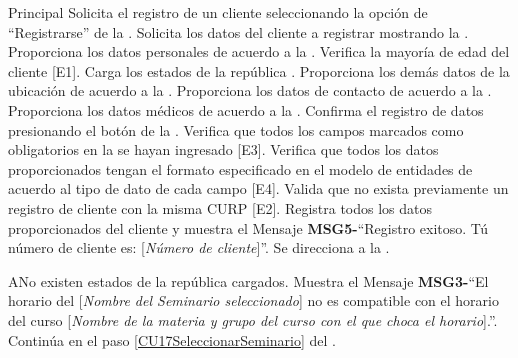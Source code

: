 	\begin{UCtrayectoria}{Principal}
		\UCpaso[\UCactor] Solicita el registro de un cliente seleccionando la opción de ``Registrarse'' de la .
		\UCpaso Solicita los datos del cliente a registrar mostrando la .
		\UCpaso[\UCactor] Proporciona los datos personales de acuerdo a la .
		\UCpaso Verifica la mayoría de edad del cliente [E1].
		\UCpaso Carga los estados de la república .
		\UCpaso[\UCactor] Proporciona los demás datos de la ubicación de acuerdo a la .
		\UCpaso[\UCactor] Proporciona los datos de contacto de acuerdo a la .
		\UCpaso[\UCactor] Proporciona los datos médicos de acuerdo a la .
		\UCpaso[\UCactor] Confirma el registro de datos presionando el botón  de la .
		\UCpaso Verifica que todos los campos marcados como obligatorios en la  se hayan ingresado [E3].
		\UCpaso Verifica que todos los datos proporcionados tengan el formato especificado en el modelo de entidades de acuerdo al tipo de dato de cada campo [E4].
		\UCpaso Valida que no exista previamente un registro de cliente con la misma CURP [E2].
		\UCpaso Registra todos los datos proporcionados del cliente y muestra el Mensaje {\bf MSG5-}``Registro exitoso. Tú número de cliente es: [{\em Número de cliente}]''.
		\UCpaso Se direcciona a la .
\end{UCtrayectoria}

		\begin{UCtrayectoriaA}{A}{No existen estados de la república cargados.}
			\UCpaso Muestra el Mensaje {\bf MSG3-}``El horario del [{\em Nombre del Seminario seleccionado}] no es compatible con el horario del curso [{\em Nombre de la materia y grupo del curso con el que choca el horario}].''.
			\UCpaso Continúa en el paso \ref{CU17SeleccionarSeminario} del .
		\end{UCtrayectoriaA}
		
